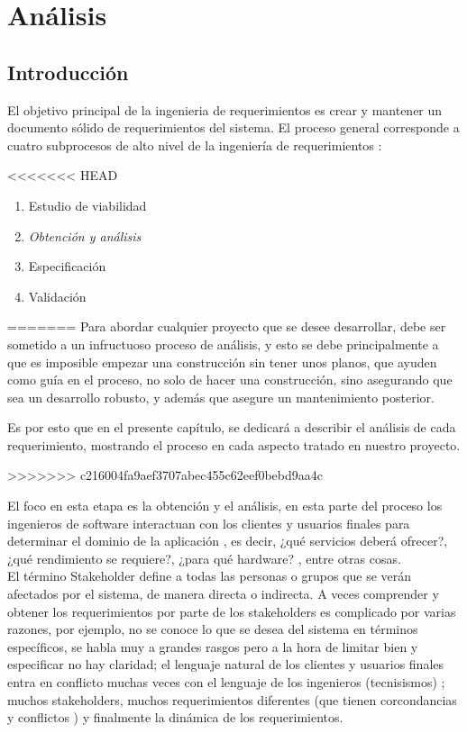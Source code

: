 \chapter{Análisis}

\section{Introducción}
El objetivo principal de la ingenieria de requerimientos es crear y mantener un documento sólido de requerimientos del sistema. El proceso general corresponde a cuatro subprocesos de alto nivel de la ingeniería de requerimientos :

<<<<<<< HEAD
\begin{enumerate}
	\item Estudio de viabilidad
	\item \emph{Obtención y análisis}
	\item Especificación
	\item Validación 
\end{enumerate} 
=======
Para abordar cualquier proyecto que se desee desarrollar, debe ser sometido a un infructuoso proceso de análisis, y esto se debe principalmente a que es imposible empezar una construcción sin tener unos planos, que ayuden como guía en el proceso, no solo de hacer una construcción, sino asegurando que sea un desarrollo robusto, y además que asegure un mantenimiento posterior.

Es por esto que en el presente capítulo, se dedicará a describir el análisis de cada requerimiento, mostrando el proceso en cada aspecto tratado en nuestro proyecto.

\newpage
>>>>>>> c216004fa9aef3707abec455c62eef0bebd9aa4c

El foco en esta etapa es la obtención y el análisis, en esta parte del proceso los ingenieros de software interactuan con los clientes y usuarios finales para determinar el dominio de la aplicación , es decir, ¿qué servicios deberá ofrecer?, ¿qué rendimiento se requiere?, ¿para qué hardware? , entre otras cosas. \cite{sommerville2005ingenieria}\\

El término Stakeholder define a todas las personas o grupos que se verán afectados por el sistema, de manera directa o indirecta. A veces comprender y obtener los requerimientos por parte de los stakeholders es complicado por varias razones, por ejemplo, no se conoce lo que se desea del sistema en términos específicos, se habla muy a grandes rasgos pero a la hora de limitar bien y especificar no hay claridad; el lenguaje natural de los clientes y usuarios finales entra en conflicto muchas veces con el lenguaje de los ingenieros (tecnisismos) ; muchos stakeholders, muchos requerimientos diferentes (que tienen corcondancias y conflictos ) y finalmente la dinámica de los requerimientos.\\


